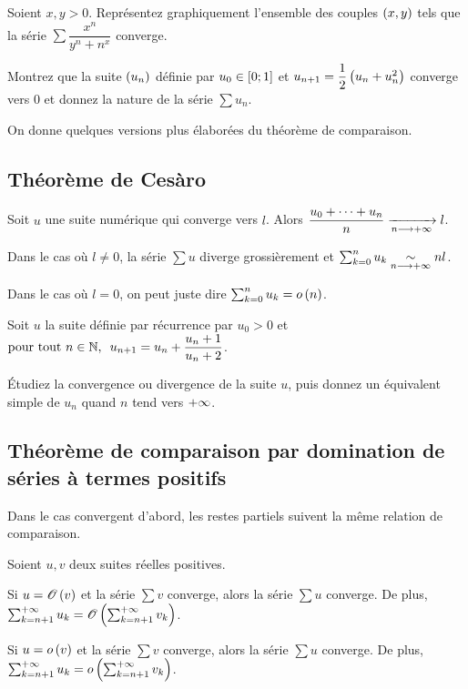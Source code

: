 \begin{exo}
Soient \(x,y>0\). Représentez graphiquement l'ensemble des couples \(\left(x,y\right)\) tels que la série \(\sum\dfrac{x^n}{y^n+n^x}\) converge.
\end{exo}

\begin{exo}
Montrez que la suite \(\left(u_n\right)\) définie par \(u_0\in\left[0;1\right]\) et \(u_{n+1}=\dfrac{1}{2}\left(u_n+u_n^2\right)\) converge vers \(0\) et donnez la nature de la série \(\sum u_n\).
\end{exo}

On donne quelques versions plus élaborées du théorème de comparaison.

\subsection{Théorème de Cesàro}

\begin{theo}
Soit \(u\) une suite numérique qui converge vers \(l\). Alors \(\dfrac{u_0+\dots+u_n}{n}\xrightarrow[n\longrightarrow+\infty]{}l\).
\end{theo}

Dans le cas où \(l\not=0\), la série \(\sum u\) diverge grossièrement et \(\sum_{k=0}^nu_k\underset{n\longrightarrow+\infty}{\sim}nl\).

Dans le cas où \(l=0\), on peut juste dire \(\sum_{k=0}^nu_k=o\left(n\right)\).

\begin{exo}
Soit \(u\) la suite définie par récurrence par \(u_0>0\) et \(\quantifs{\tpt n\in\N}u_{n+1}=u_n+\dfrac{u_n+1}{u_n+2}\).

Étudiez la convergence ou divergence de la suite \(u\), puis donnez un équivalent simple de \(u_n\) quand \(n\) tend vers \(+\infty\).
\end{exo}

\subsection{Théorème de comparaison par domination de séries à termes positifs}

Dans le cas convergent d'abord, les restes partiels suivent la même relation de comparaison.

\begin{theo}
Soient \(u,v\) deux suites réelles positives.

Si \(u=\mathscr{O}\left(v\right)\) et la série \(\sum v\) converge, alors la série \(\sum u\) converge. De plus, \(\sum_{k=n+1}^{+\infty}u_k=\mathscr{O}\left(\sum_{k=n+1}^{+\infty}v_k\right)\).

Si \(u=o\left(v\right)\) et la série \(\sum v\) converge, alors la série \(\sum u\) converge. De plus, \(\sum_{k=n+1}^{+\infty}u_k=o\left(\sum_{k=n+1}^{+\infty}v_k\right)\).
\end{theo}

